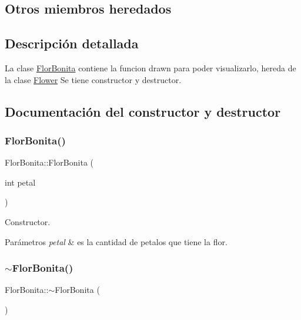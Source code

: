 \subsection*{Otros miembros heredados}


\subsection{Descripción detallada}
La clase \hyperlink{classFlorBonita}{Flor\+Bonita} contiene la funcion drawn para poder visualizarlo, hereda de la clase \hyperlink{classFlower}{Flower}  Se tiene constructor y destructor. 

\subsection{Documentación del constructor y destructor}
\mbox{\label{classFlorBonita_afccba3e47c8f7ad9e6da420aeba9769f}} 
\subsubsection{\texorpdfstring{Flor\+Bonita()}{FlorBonita()}}
{\footnotesize\ttfamily Flor\+Bonita\+::\+Flor\+Bonita (\begin{DoxyParamCaption}\item[{int}]{petal }\end{DoxyParamCaption})}

Constructor. 
\begin{DoxyParams}{Parámetros}
{\em petal} & es la cantidad de petalos que tiene la flor. \\
\hline
\end{DoxyParams}
\mbox{\label{classFlorBonita_ada709e8050834cb8d988b5ba1bc558dc}} 
\subsubsection{\texorpdfstring{$\sim$\+Flor\+Bonita()}{~FlorBonita()}}
{\footnotesize\ttfamily Flor\+Bonita\+::$\sim$\+Flor\+Bonita (\begin{DoxyParamCaption}{ }\end{DoxyParamCaption})}

